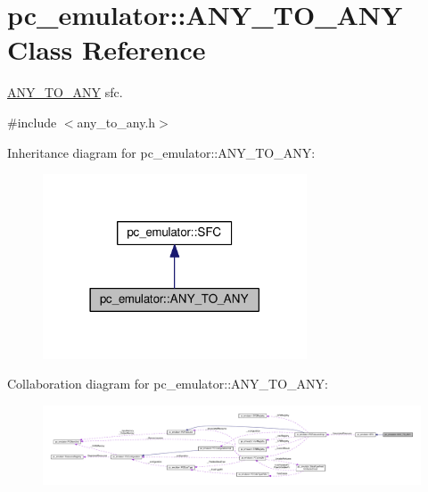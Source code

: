 \hypertarget{classpc__emulator_1_1ANY__TO__ANY}{}\section{pc\+\_\+emulator\+:\+:A\+N\+Y\+\_\+\+T\+O\+\_\+\+A\+NY Class Reference}
\label{classpc__emulator_1_1ANY__TO__ANY}


\hyperlink{classpc__emulator_1_1ANY__TO__ANY}{A\+N\+Y\+\_\+\+T\+O\+\_\+\+A\+NY} sfc.  




{\ttfamily \#include $<$any\+\_\+to\+\_\+any.\+h$>$}



Inheritance diagram for pc\+\_\+emulator\+:\+:A\+N\+Y\+\_\+\+T\+O\+\_\+\+A\+NY\+:
\nopagebreak
\begin{figure}[H]
\begin{center}
\leavevmode
\includegraphics[width=222pt]{classpc__emulator_1_1ANY__TO__ANY__inherit__graph}
\end{center}
\end{figure}


Collaboration diagram for pc\+\_\+emulator\+:\+:A\+N\+Y\+\_\+\+T\+O\+\_\+\+A\+NY\+:
\nopagebreak
\begin{figure}[H]
\begin{center}
\leavevmode
\includegraphics[width=350pt]{classpc__emulator_1_1ANY__TO__ANY__coll__graph}
\end{center}
\end{figure}
